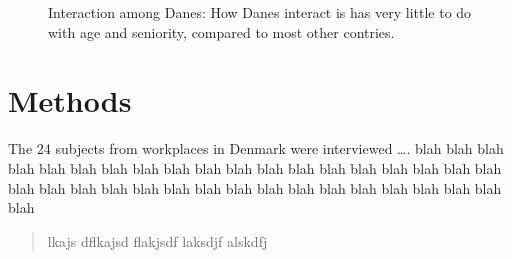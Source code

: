 \documentclass[
  a4paper,
]{scrbook}
\begin{document}
\begin{figure}[H]


\caption{\label{fig-danish-interaction}Interaction among Danes: How
Danes interact is has very little to do with age and seniority, compared
to most other contries.}

\end{figure}%

\chapter{Methods}\label{methods}

\label{doc-sampling}
The 24 subjects from workplaces in Denmark were interviewed \ldots. blah
blah blah blah blah blah blah blah blah blah blah blah blah blah blah
blah blah blah blah blah blah blah blah blah blah blah blah blah blah
blah blah blah blah blah blah blah

\begin{quote}
lkajs dflkajsd flakjsdf laksdjf alskdfj
\end{quote}


\backmatter
\end{document}
